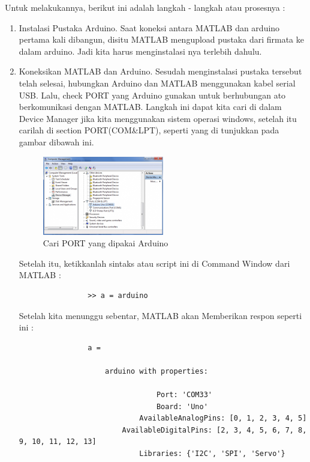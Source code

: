 	Untuk melakukannya, berikut ini adalah langkah - langkah atau prosesnya :
		\begin{enumerate}
			\item Instalasi Pustaka Arduino.
				Saat koneksi antara MATLAB dan arduino pertama kali dibangun, disitu MATLAB mengupload pustaka dari firmata ke dalam arduino. Jadi kita harus menginstalasi nya terlebih dahulu.
			\item Koneksikan MATLAB dan Arduino.
				Sesudah menginstalasi pustaka tersebut telah selesai, hubungkan Arduino dan MATLAB menggunakan kabel serial USB. Lalu, check PORT yang Arduino gunakan untuk berhubungan ato berkomunikasi dengan MATLAB. Langkah ini dapat kita cari di dalam Device Manager jika kita menggunakan sistem operasi windows, setelah itu carilah di section PORT(COM&LPT), seperti yang di tunjukkan pada gambar dibawah ini.
				
				\begin{figure}[ht]
					\centerline{\includegraphics[width=0.5\textwidth]{figures/knksi.png}}
					\caption{Cari PORT yang dipakai Arduino}
					\label{knksi}
				\end{figure}
				
				Setelah itu, ketikkanlah sintaks atau script ini di Command Window dari MATLAB :
				
				\begin{verbatim}
				>> a = arduino
				\end{verbatim}	
				
				Setelah kita menunggu sebentar, MATLAB akan Memberikan respon seperti ini :
				
				\begin{verbatim}
				a = 
 
					arduino with properties:
 
								Port: 'COM33'
								Board: 'Uno'
							AvailableAnalogPins: [0, 1, 2, 3, 4, 5]
						AvailableDigitalPins: [2, 3, 4, 5, 6, 7, 8, 9, 10, 11, 12, 13]
							Libraries: {'I2C', 'SPI', 'Servo'}
				\end{verbatim}
				

\end{enumerate}
